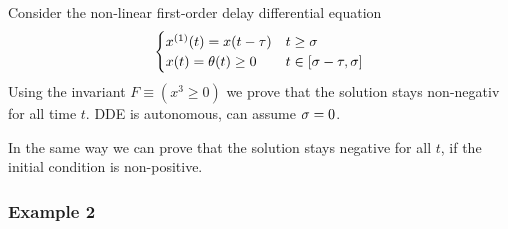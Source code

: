             Consider the non-linear first-order delay differential equation
            \begin{equation}
                \begin{cases}
                    \D{x}(t) = x(t-\tau) & t \geq \tzero\\
                    x(t) = \theta(t)\geq 0 & t \in [\tzero-\tau,\tzero]
                \end{cases}
            \end{equation}
            Using the invariant $F\equiv(x^3\geq 0)$ we prove that the solution stays non-negativ for all time $t$.
            DDE is autonomous, can assume $\sigma=0$.
            \footnotesize
            \begin{sequentdeduction}
            \end{sequentdeduction}\normalsize
            In the same way we can prove that the solution stays negative for all $t$, if the initial condition is non-positive.

        \subsubsection{Example 2}
            \label{sec:ddi-example-2}

